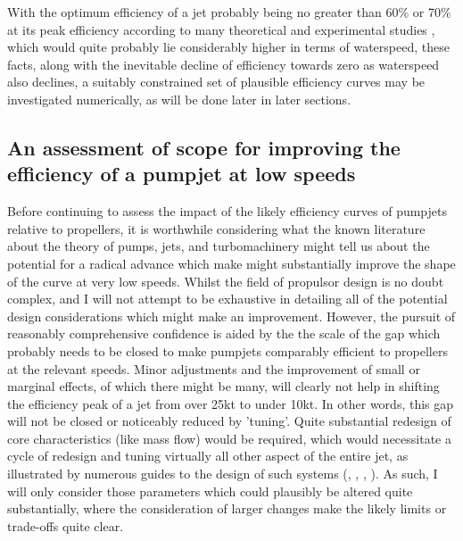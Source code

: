 \documentclass{article}\usepackage[]{graphicx}\usepackage[]{color}
\begin{document}
With the optimum efficiency of a jet probably being no greater than 60\% or 70\% at its peak efficiency according to many theoretical and experimental studies \parencite{lu2015}, which would quite probably lie considerably higher in terms of waterspeed, these facts, along with the inevitable decline of efficiency towards zero as waterspeed also declines, a suitably constrained set of plausible efficiency curves may be investigated numerically, as will be done later in later sections.

\subsection{An assessment of scope for improving the efficiency of a pumpjet at low speeds}
Before continuing to assess the impact of the likely efficiency curves of pumpjets relative to propellers, it is worthwhile considering what the known literature about the theory of pumps, jets, and turbomachinery might tell us about the potential for a radical advance which make might substantially improve the shape of the curve at very low speeds.  Whilst the field of propulsor design is no doubt complex, and I will not attempt to be exhaustive in detailing all of the potential design considerations which might make an improvement.  However, the pursuit of reasonably comprehensive confidence is aided by the the scale of the gap which probably needs to be closed to make pumpjets comparably efficient to propellers at the relevant speeds.  Minor adjustments and the improvement of small or marginal effects, of which there might be many, will clearly not help in shifting the efficiency peak of a jet from over 25kt to under 10kt.  In other words, this gap will not be closed or noticeably reduced by 'tuning'.  Quite substantial redesign of core characteristics (like mass flow) would be required, which would necessitate a cycle of redesign and tuning virtually all other aspect of the entire jet, as illustrated by numerous guides to the design of such systems (\cite{bruce1974}, \cite{furuya1988}, \cite{mccormick1963design}, \cite{henderson1964}).  As such, I will only consider those parameters which could plausibly be altered quite substantially, where the consideration of larger changes make the likely limits or trade-offs quite clear.
\end{document}
